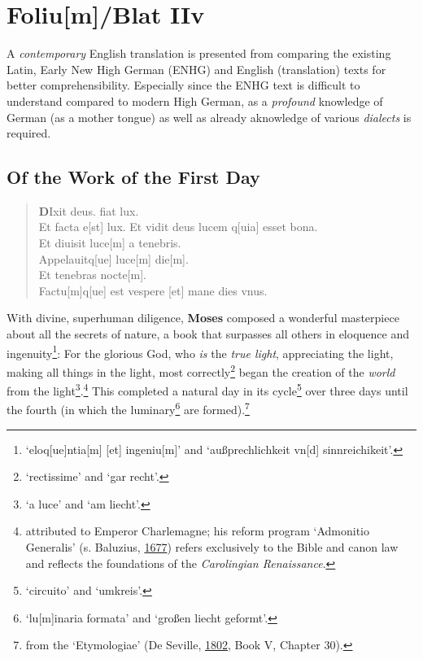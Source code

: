 \documentclass[
]{article}
\author{Dietmar Gerald Schrausser}
\date{09.05.2026}
\begin{document}
\hypertarget{foliumblat-iiv}{%
\section{Foliu{[}m{]}/Blat IIv}\label{foliumblat-iiv}}

A \emph{contemporary} English translation is presented from comparing
the existing Latin, Early New High German (ENHG) and English
(translation) texts for better comprehensibility. Especially since the
ENHG text is difficult to understand compared to modern High German, as
a \emph{profound} knowledge of German (as a mother tongue) as well as
already aknowledge of various \emph{dialects} is required.

\hypertarget{of-the-work-of-the-first-day}{%
\subsection{Of the Work of the First
Day}\label{of-the-work-of-the-first-day}}

\begin{quote}
\textbf{D}Ixit deus. fiat lux.\\
Et facta e{[}st{]} lux. Et vidit deus lucem q{[}uia{]} esset bona.\\
Et diuisit luce{[}m{]} a tenebris.\\
Appelauitq{[}ue{]} luce{[}m{]} die{[}m{]}.\\
Et tenebras nocte{[}m{]}.\\
Factu{[}m{]}q{[}ue{]} est vespere {[}et{]} mane dies vnus.
\end{quote}

With divine, superhuman diligence, \textbf{Moses} composed a wonderful
masterpiece about all the secrets of nature, a book that surpasses all
others in eloquence and ingenuity\footnote{`eloq{[}ue{]}ntia{[}m{]}
  {[}et{]} ingeniu{[}m{]}' and `außprechlichkeit vn{[}d{]}
  sinnreichikeit'.}: For the glorious God, who \emph{is} the \emph{true
light}, appreciating the light, making all things in the light, most
correctly\footnote{`rectissime' and `gar recht'.} began the creation of
the \emph{world} from the light\footnote{`a luce' and `am liecht'.}.\footnote{attributed
  to Emperor Charlemagne; his reform program `Admonitio Generalis' (s.
  Baluzius,
  \href{https://digital.ub.uni-paderborn.de/eab/content/zoom/1075337}{1677})
  refers exclusively to the Bible and canon law and reflects the
  foundations of the \emph{Carolingian Renaissance}.} This completed a
natural day in its cycle\footnote{`circuito' and `umkreis'.} over three
days until the fourth (in which the luminary\footnote{`lu{[}m{]}inaria
  formata' and `großen liecht geformt'.} are formed).\footnote{from the
  `Etymologiae' (De Seville,
  \href{https://books.google.com/books?id=wb8Z_vlSyJwC}{1802}, Book V,
  Chapter 30).}
\end{document}
